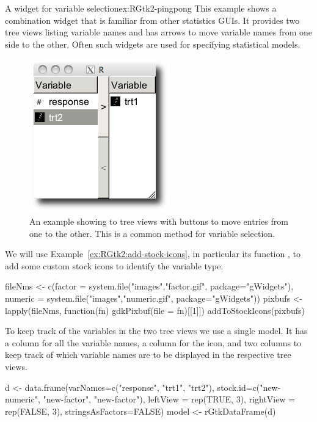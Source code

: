 \begin{example}{A widget for variable selection}{ex:RGtk2-pingpong}
This example shows a combination widget that is familiar from other
statistics GUIs. It provides two tree views listing variable names and
has arrows to move variable names from one side to the other. Often
such widgets are used for specifying statistical models. 

\begin{figure}
  \centering
  \includegraphics[width=.4\textwidth]{ex-RGtk2-pingpong}
  \caption{An example showing to tree views with buttons to move
    entries from one to the other. This is a common method for
    variable selection.}
  \label{fig:RGtk2-pingpong}
\end{figure}


We will use Example~\ref{ex:RGtk2:add-stock-icons}, in particular its
function , to add some custom
stock icons to identify the variable type.
\begin{Schunk}
\begin{Sinput}
 fileNms <- c(factor = system.file("images","factor.gif", package="gWidgets"),
              numeric = system.file("images","numeric.gif", package="gWidgets"))
 pixbufs <- lapply(fileNms, function(fn) gdkPixbuf(file = fn)[[1]])
 addToStockIcons(pixbufs)
\end{Sinput}
\end{Schunk}

To keep track of the variables in the two tree views we use a single
model. It has a column for all the variable names, a column for the
icon, and two columns to keep track of which variable names are to be
displayed in the respective tree views.
\begin{Schunk}
\begin{Sinput}
 d <- data.frame(varNames=c("response", "trt1", "trt2"),
                 stock.id=c("new-numeric", "new-factor", "new-factor"),
                 leftView  = rep(TRUE, 3),
                 rightView = rep(FALSE, 3),
                 stringsAsFactors=FALSE)
 model <- rGtkDataFrame(d)
\end{Sinput}
\end{Schunk}


\end{example}
